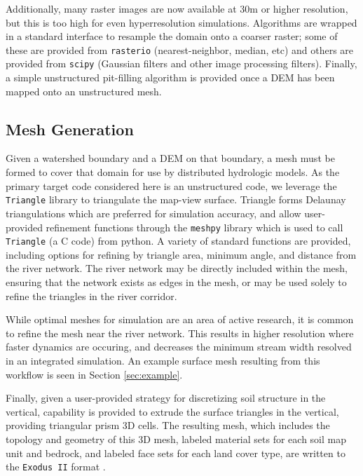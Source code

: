 \documentclass[a4paper,fleqn]{cas-dc}
\newcommand{\code}[1]{\texttt{#1}}
\begin{document}
Additionally, many raster images are now available at 30m or higher resolution, but this is too high for even hyperresolution simulations.
Algorithms are wrapped in a standard interface to resample the domain onto a coarser raster; some of these are provided from \code{rasterio} (nearest-neighbor, median, etc) and others are provided from \code{scipy} (Gaussian filters and other image processing filters).
Finally, a simple unstructured pit-filling algorithm is provided once a DEM has been mapped onto an unstructured mesh.

\subsection{Mesh Generation}
%
Given a watershed boundary and a DEM on that boundary, a mesh must be formed to cover that domain for use by distributed hydrologic models.
As the primary target code considered here is an unstructured code, we leverage the \code{Triangle} library\cite{Triangle} to triangulate the map-view surface.
Triangle forms Delaunay triangulations which are preferred for simulation accuracy, and allow user-provided refinement functions through the \code{meshpy} \cite{meshpy} library which is used to call \code{Triangle} (a C code) from python.
A variety of standard functions are provided, including options for refining by triangle area, minimum angle, and distance from the river network.
The river network may be directly included within the mesh, ensuring that the network exists as edges in the mesh, or may be used solely to refine the triangles in the river corridor.

While optimal meshes for simulation are an area of active research\cite{ozgur2020??}, it is common to refine the mesh near the river network.
This results in higher resolution where faster dynamics are occuring, and decreases the minimum stream width resolved in an integrated simulation.
An example surface mesh resulting from this workflow is seen in Section \ref{sec:example}.

Finally, given a user-provided strategy for discretizing soil structure in the vertical, capability is provided to extrude the surface triangles in the vertical, providing triangular prism 3D cells.
The resulting mesh, which includes the topology and geometry of this 3D mesh, labeled material sets for each soil map unit and bedrock, and labeled face sets for each land cover type, are written to the \code{Exodus II} format \cite{greg}.
\end{document}
